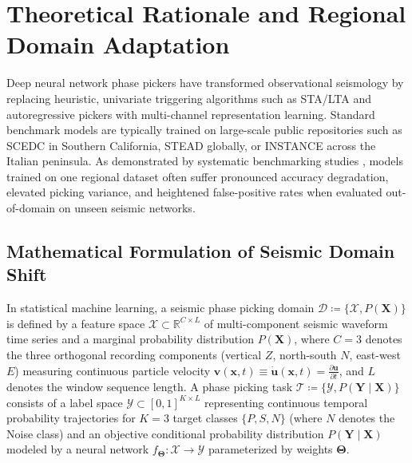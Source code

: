 \section{Theoretical Rationale and Regional Domain Adaptation}
\label{sec:domain_adaptation_theory}

Deep neural network phase pickers have transformed observational
seismology by replacing heuristic, univariate triggering algorithms
such as \ac{STA/LTA} and autoregressive pickers
\parencite{LEONARD1999247}
with multi-channel representation learning. Standard benchmark models are
typically trained on large-scale public repositories such as \ac{SCEDC}
in Southern California, \ac{STEAD}
globally, or \ac{INSTANCE} across the Italian peninsula.
As demonstrated by systematic benchmarking studies \parencite{WhichPicker},
models trained on one regional dataset often suffer pronounced accuracy
degradation, elevated picking variance, and heightened false-positive rates
when evaluated out-of-domain on unseen seismic networks.

\subsection{Mathematical Formulation of Seismic Domain Shift}
\label{subsec:domain_shift_math}

In statistical machine learning, a seismic phase picking domain
$\mathcal{D} \coloneqq \{\mathcal{X}, P(\mathbf{X})\}$ is defined by
a feature space
$\mathcal{X} \subset \mathbb{R}^{C \times L}$ of multi-component seismic
waveform time series and a marginal probability distribution $P(\mathbf{X})$,
where $C = \num{3}$ denotes the three orthogonal recording
components (vertical $Z$,
north-south $N$, east-west $E$) measuring continuous particle velocity
$\mathbf{v}(\mathbf{x}, t) \equiv \dot{\mathbf{u}}(\mathbf{x}, t) =
\frac{\partial\mathbf{u}}{\partial t}$, and $L$ denotes the window
sequence length.
A phase picking task $\mathcal{T} \coloneqq \{\mathcal{Y}, P(\mathbf{Y} \mid
\mathbf{X})\}$ consists of a label space $\mathcal{Y} \subset [0,
1]^{K \times L}$ representing
continuous temporal probability trajectories for $K = \num{3}$ target classes
$\{P, S, N\}$ (where $N$ denotes the Noise class) and an objective conditional
probability distribution
$P(\mathbf{Y} \mid \mathbf{X})$ modeled by a neural network
$f_{\bm{\Theta}}: \mathcal{X} \to \mathcal{Y}$ parameterized by
weights $\bm{\Theta}$.

